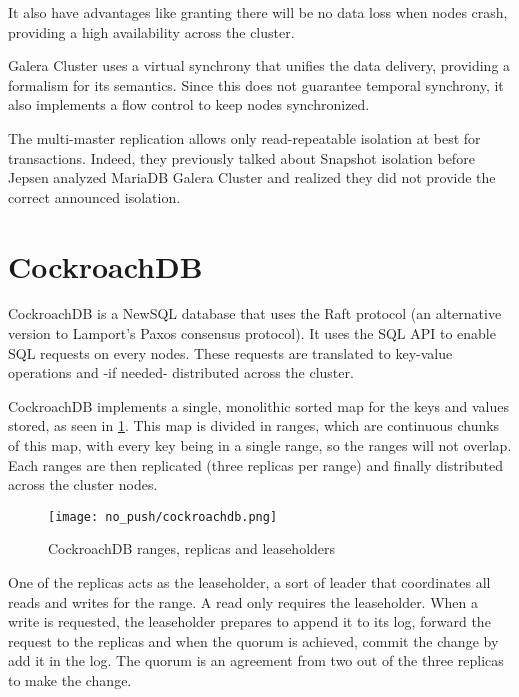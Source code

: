It also have advantages like granting there will be no data loss when nodes crash, providing a high availability across the cluster.

Galera Cluster uses a virtual synchrony that unifies the data delivery, providing a formalism for its semantics. Since this does not guarantee temporal synchrony, it also implements a flow control to keep nodes synchronized.

The multi-master replication allows only read-repeatable isolation at best for transactions. Indeed, they previously talked about Snapshot isolation before Jepsen analyzed MariaDB Galera Cluster and realized they did not provide the correct announced isolation\cite{MGC:jepsen}.


\section{CockroachDB}
CockroachDB is a NewSQL database that uses the Raft protocol (an alternative version to Lamport's Paxos consensus protocol).
It uses the SQL API to enable SQL requests on every nodes. These requests are translated to key-value operations and -if needed- distributed across the cluster.

CockroachDB implements a single, monolithic sorted map for the keys and values stored, as seen in \ref{fig:cockroachdb}. This map is divided in ranges, which are continuous chunks of this map, with every key being in a single range, so the ranges will not overlap. Each ranges are then replicated (three replicas per range) and finally distributed across the cluster nodes.\cite{CRDB:automatedoperations}

\begin{figure}[H]
  \vspace{-10pt}
  \centering
  \centerline{\texttt{[image: no\_push/cockroachdb.png]}}
  \vspace{-5pt}
  \caption{CockroachDB ranges, replicas and leaseholders}
  \vspace{-5pt}
  \label{fig:cockroachdb}
\end{figure}

One of the replicas acts as the leaseholder, a sort of leader that coordinates all reads and writes for the range. A read only requires the leaseholder.
When a write is requested, the leaseholder prepares to append it to its log, forward the request to the replicas and when the quorum is achieved, commit the change by add it in the log. The quorum is an agreement from two out of the three replicas to make the change.

